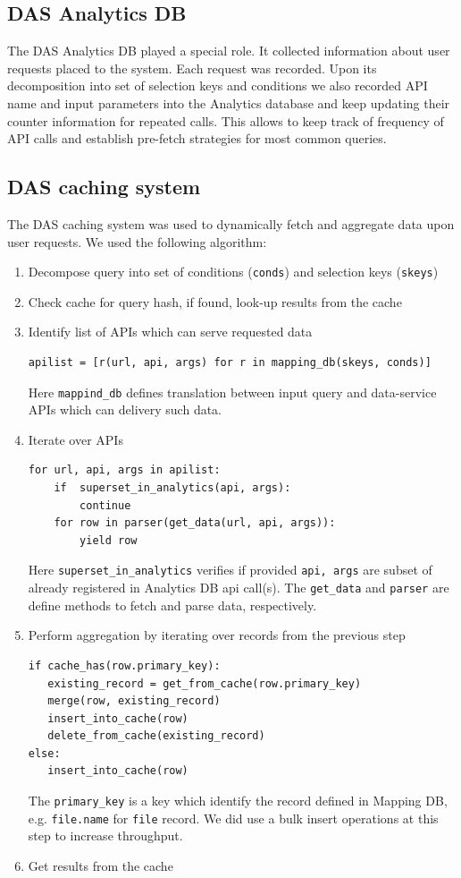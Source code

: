 \documentclass[1p,times]{elsarticle}
\begin{document}
\subsection{DAS Analytics DB}
The DAS Analytics DB played a special role. It collected information
about user requests placed to the system. Each request was recorded. Upon its
decomposition into set of selection keys and conditions we also recorded
API name and input parameters into the Analytics database and 
keep updating their counter information for repeated calls. 
This allows to keep track of frequency of API calls and establish 
pre-fetch strategies for most common queries.

\subsection{DAS caching system}
The DAS caching system was used to dynamically fetch
and aggregate data upon user requests. We used the following 
algorithm:
\begin{enumerate}[1.]
\item Decompose query into set of conditions (\verb+conds+) 
and selection keys (\verb+skeys+)
\item Check cache for query hash, if found, look-up results from the cache
\item Identify list of APIs which can serve requested data
\begin{verbatim}
apilist = [r(url, api, args) for r in mapping_db(skeys, conds)]
\end{verbatim}
Here \verb+mappind_db+ defines translation between input query and data-service
APIs which can delivery such data.
\item Iterate over APIs
\begin{verbatim}
for url, api, args in apilist:
    if  superset_in_analytics(api, args):
        continue
    for row in parser(get_data(url, api, args)):
        yield row
\end{verbatim}
Here \verb+superset_in_analytics+ verifies if provided \verb+api, args+
are subset of already registered in Analytics DB api call(s). The 
\verb+get_data+ and \verb+parser+ are define methods to fetch and parse
data, respectively.
\item Perform aggregation by iterating over records from the previous step
\begin{verbatim}
if cache_has(row.primary_key):
   existing_record = get_from_cache(row.primary_key)
   merge(row, existing_record)
   insert_into_cache(row)
   delete_from_cache(existing_record)
else:
   insert_into_cache(row)
\end{verbatim}
The \verb+primary_key+
is a key which identify the record defined in Mapping DB, e.g. \verb+file.name+
for \verb+file+ record.
We did use a bulk insert operations at this step to increase throughput. 
\item Get results from the cache
\end{enumerate}
\end{document}
